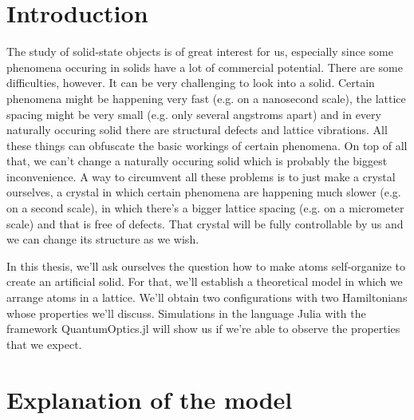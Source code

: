 \section{Introduction}
The study of solid-state objects is of great interest for us, especially since some phenomena occuring in solids have a lot of commercial potential. There are some difficulties, however. It can be very challenging to look into a solid. Certain phenomena might be happening very fast (e.g. on a nanosecond scale), the lattice spacing might be very small (e.g. only several angstroms apart) and in every naturally occuring solid there are structural defects and lattice vibrations. All these things can obfuscate the basic workings of certain phenomena. On top of all that, we can't change a naturally occuring solid which is probably the biggest inconvenience. A way to circumvent all these problems is to just make a crystal ourselves, a crystal in which certain phenomena are happening much slower (e.g. on a second scale), in which there's a bigger lattice spacing (e.g. on a micrometer scale) and that is free of defects. That crystal will be fully controllable by us and we can change its structure as we wish.

In this thesis, we'll ask ourselves the question how to make atoms self-organize to create an artificial solid. For that, we'll establish a theoretical model in which we arrange atoms in a lattice. We'll obtain two configurations with two Hamiltonians whose properties we'll discuss. Simulations in the language Julia with the framework QuantumOptics.jl will show us if we're able to observe the properties that we expect.

\section{Explanation of the model}

